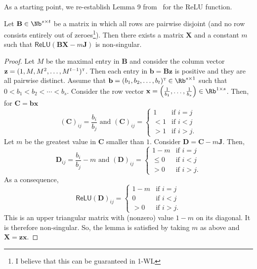 As a starting point, we re-establish Lemma 9
from~\cite{grohewl} for the ReLU function.
\begin{lemma}
  Let
  $\mathbf{B}\in \Nb^{s\times t}$ be a matrix in which all
  rows are pairwise disjoint (and no row consists entirely
  out of zeroes\footnote{I believe that this can be
  guaranteed in 1-WL}).
  Then there exists a matrix $\mathbf{X}$ and a constant $m$
  such that $\textsf{ReLU}(\mathbf{BX}-m\mathbf{J})$ is
  non-singular.
\end{lemma}
\begin{proof}
Let $M$ be the maximal entry in $\mathbf{B}$ and consider the column vector $\mathbf{z}=(1,M,M^2,\ldots,M^{t-1})^{\textsc{t}}$.
Then each entry in $\mathbf{b}=\mathbf{B}\mathbf{z}$ is positive and they are all pairwise distinct. Assume that $\mathbf{b}=(b_1,b_2,\ldots,b_t)^{\textsc{t}}\in\Rb^{s\times 1}$
such that $0< b_1< b_2<\cdots < b_s$. Consider the row vector $\mathbf{x}=\left(\frac{1}{b_1},\ldots,\frac{1}{b_s}\right)\in \Rb^{1\times s}$. Then, for $\mathbf{C}=\mathbf{b}\mathbf{x}$
$$
(\mathbf{C})_{ij}=\frac{b_i}{b_j}  \text{ and } (\mathbf{C})_{ij}=\begin{cases}  1 & \text{if $i=j$}\\
< 1 & \text{if $i<j$}\\
> 1 & \text{if $i>j$}.
\end{cases}
$$
Let $m$ be the greatest value  in $\mathbf{C}$ smaller than $1$.
Consider $\mathbf{D}=\mathbf{C}- m\mathbf{J}$.
Then,
$$
\mathbf{D}_{ij}=\frac{b_i}{b_j}- m \text{ and } (\mathbf{D})_{ij}=\begin{cases}  1-m & \text{if $i=j$} \\
\leq 0 & \text{if $i<j$}\\
>0  & \text{if $i>j$}.
\end{cases}
$$
As a consequence,
$$
\textsf{ReLU}(\mathbf{D})_{ij}=\begin{cases}  1-m & \text{if $i=j$}\\
0 & \text{if $i<j$}\\
>0  & \text{if $i>j$}.
\end{cases}
$$
This is an upper triangular matrix with (nonzero) value $1-m$ on its diagonal. It is therefore non-singular. So, the lemma is satisfied by taking $m$ as above and
$\mathbf{X}=\mathbf{z}\mathbf{x}$.
\end{proof}

